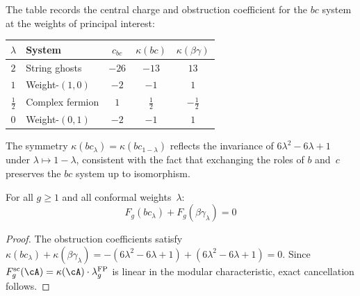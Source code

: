 \begin{computation}\label{comp:fermion-kappa-table}
The table records the central charge and obstruction coefficient for
the $bc$ system at the weights of principal interest:

\medskip
\begin{center}
\renewcommand{\arraystretch}{1.3}
\begin{tabular}{clccc}
\toprule
$\lambda$ & System & $c_{bc}$ & $\kappa(bc)$ & $\kappa(\beta\gamma)$ \\
\midrule
$2$ & String ghosts & $-26$ & $-13$ & $13$ \\[3pt]
$1$ & Weight-$(1,0)$ & $-2$ & $-1$ & $1$ \\[3pt]
$\frac{1}{2}$ & Complex fermion & $1$ & $\frac{1}{2}$ & $-\frac{1}{2}$ \\[6pt]
$0$ & Weight-$(0,1)$ & $-2$ & $-1$ & $1$ \\[3pt]
\bottomrule
\end{tabular}
\end{center}

\medskip
\noindent
The symmetry $\kappa(bc_\lambda) = \kappa(bc_{1-\lambda})$
reflects the invariance of $6\lambda^2 - 6\lambda + 1$ under
$\lambda \mapsto 1 - \lambda$, consistent with the fact that
exchanging the roles of $b$ and~$c$ preserves the $bc$ system
up to isomorphism.
\end{computation}

\begin{proposition}\label{prop:bc-betagamma-complementarity}

For all $g \geq 1$ and all conformal weights~$\lambda$:
\begin{equation}\label{eq:fermion-complementarity}
F_g(bc_\lambda) + F_g(\beta\gamma_\lambda) = 0
\end{equation}
\end{proposition}

\begin{proof}
The obstruction coefficients satisfy
$\kappa(bc_\lambda) + \kappa(\beta\gamma_\lambda)
= -(6\lambda^2 - 6\lambda + 1) + (6\lambda^2 - 6\lambda + 1) = 0$.
Since $F_g^{\mathrm{sc}}(\cA)
=\kappa(\cA) \cdot \lambda_g^{\mathrm{FP}}$ is linear
in the modular characteristic, exact cancellation follows.
\end{proof}

